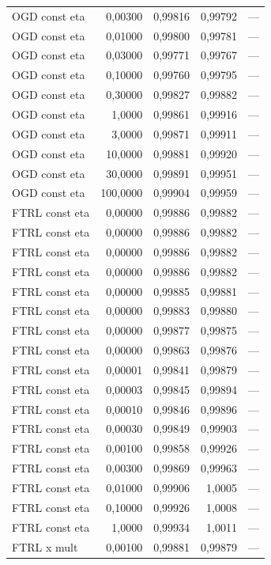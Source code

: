{\begin{longtable}{@{}lrrrl@{}}
OGD const eta & 0,00300 & 0,99816 & 0,99792 & --- \\
OGD const eta & 0,01000 & 0,99800 & 0,99781 & --- \\
OGD const eta & 0,03000 & 0,99771 & 0,99767 & --- \\
OGD const eta & 0,10000 & 0,99760 & 0,99795 & --- \\
OGD const eta & 0,30000 & 0,99827 & 0,99882 & --- \\
OGD const eta & 1,0000 & 0,99861 & 0,99916 & --- \\
OGD const eta & 3,0000 & 0,99871 & 0,99911 & --- \\
OGD const eta & 10,0000 & 0,99881 & 0,99920 & --- \\
OGD const eta & 30,0000 & 0,99891 & 0,99951 & --- \\
OGD const eta & 100,0000 & 0,99904 & 0,99959 & --- \\
FTRL const eta & 0,00000 & 0,99886 & 0,99882 & --- \\
FTRL const eta & 0,00000 & 0,99886 & 0,99882 & --- \\
FTRL const eta & 0,00000 & 0,99886 & 0,99882 & --- \\
FTRL const eta & 0,00000 & 0,99886 & 0,99882 & --- \\
FTRL const eta & 0,00000 & 0,99885 & 0,99881 & --- \\
FTRL const eta & 0,00000 & 0,99883 & 0,99880 & --- \\
FTRL const eta & 0,00000 & 0,99877 & 0,99875 & --- \\
FTRL const eta & 0,00000 & 0,99863 & 0,99876 & --- \\
FTRL const eta & 0,00001 & 0,99841 & 0,99879 & --- \\
FTRL const eta & 0,00003 & 0,99845 & 0,99894 & --- \\
FTRL const eta & 0,00010 & 0,99846 & 0,99896 & --- \\
FTRL const eta & 0,00030 & 0,99849 & 0,99903 & --- \\
FTRL const eta & 0,00100 & 0,99858 & 0,99926 & --- \\
FTRL const eta & 0,00300 & 0,99869 & 0,99963 & --- \\
FTRL const eta & 0,01000 & 0,99906 & 1,0005 & --- \\
FTRL const eta & 0,10000 & 0,99926 & 1,0008 & --- \\
FTRL const eta & 1,0000 & 0,99934 & 1,0011 & --- \\
FTRL x mult & 0,00100 & 0,99881 & 0,99879 & --- \\

\end{longtable}}
